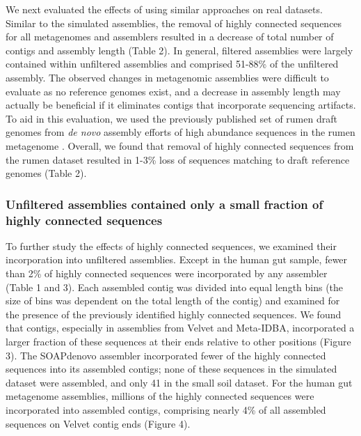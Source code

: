\documentclass[10pt]{article}
\begin{document}
We next evaluated the effects of using similar approaches on
real datasets.  Similar to the simulated assemblies, the
removal of highly connected sequences for all metagenomes and
assemblers resulted in a decrease of total number of contigs and assembly
length (Table 2).  In general, filtered assemblies were largely
contained within unfiltered assemblies and comprised 51-88\% of the
unfiltered assembly.  The observed changes in metagenomic assemblies
were difficult to evaluate as no reference genomes exist, 
and a decrease in assembly length may actually be beneficial if it
eliminates contigs that incorporate sequencing artifacts.
To aid in this evaluation, we used the previously published set of
rumen draft genomes from \emph{de novo} assembly efforts of high
abundance sequences in the rumen metagenome \cite{Hess:2011p686}.
Overall, we found that removal of highly connected sequences from the
rumen dataset resulted in 1-3\% loss of sequences matching to
draft reference genomes (Table 2).


\subsubsection*{Unfiltered assemblies contained only a small fraction of highly connected sequences}
To further study the effects of highly connected sequences, we
examined their incorporation into unfiltered assemblies.  Except in
the human gut sample, fewer than 2\% of highly connected sequences
were incorporated by any assembler (Table 1 and 3).  Each assembled
contig was divided into equal length bins (the size of bins was
dependent on the total length of the contig) and examined for the
presence of the previously identified highly connected sequences.  We
found that contigs, especially in assemblies from Velvet and
Meta-IDBA, incorporated a larger fraction of these sequences at their
ends relative to other positions (Figure 3).  The SOAPdenovo
assembler incorporated fewer of the highly connected sequences into
its assembled contigs; none of these sequences in the simulated
dataset were assembled, and only 41 in the small soil dataset.  For
the human gut metagenome assemblies, millions of the highly connected
sequences were incorporated into assembled contigs, comprising nearly
4\% of all assembled sequences on Velvet contig ends (Figure 4).
\end{document}
